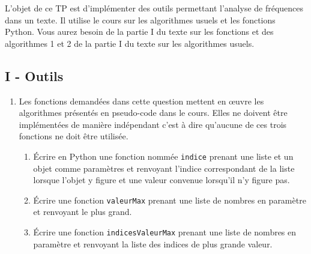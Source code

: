 L'objet de ce TP est d'implémenter des outils permettant l'analyse de fréquences dans un texte.\newline
Il utilise le cours sur les algorithmes usuels et les fonctions Python. Vous aurez besoin de la partie I du texte sur les fonctions et des algorithmes 1 et 2 de la partie I du texte sur les algorithmes usuels. 

\subsection*{I - Outils}
\begin{enumerate}
  \item Les fonctions demandées dans cette question mettent en \oe{}uvre les algorithmes présentés en pseudo-code dans le cours. Elles ne doivent être implémentées de manière indépendant c'est à dire qu'aucune de ces trois fonctions ne doit être utilisée.
\begin{enumerate}
  \item \'Ecrire en Python une fonction nommée \verb|indice| prenant une liste et un objet comme paramètres et renvoyant l'indice correspondant de la liste lorsque l'objet y figure et une valeur convenue lorsqu'il n'y figure pas.
  \item \'Ecrire une fonction \texttt{valeurMax} prenant une liste de nombres en paramètre et renvoyant le plus grand.
  \item \'Ecrire une fonction \texttt{indicesValeurMax} prenant une liste de nombres en paramètre et renvoyant la liste des indices de plus grande valeur.   
\end{enumerate}
   

\end{enumerate}
